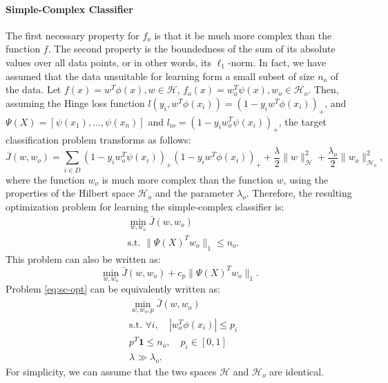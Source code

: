 \documentclass[12pt]{article}
\begin{document}
	\paragraph{Simple-Complex Classifier}
	The first necessary property for $f_o$ is that it be much more complex than the function $f$. The second property is the boundedness of the sum of its absolute values over all data points, or in other words, its $\ell_1$-norm. In fact, we have assumed that the data unsuitable for learning form a small subset of size $n_o$ of the data. Let $f(x) = w^T \phi(x), w \in \mathcal{H}$, $f_o(x) = w_o^T \psi(x), w_o \in \mathcal{H}_o$. Then, assuming the Hinge loss function $l(y_i, w^T\phi(x_i)) = (1 - y_i w^T\phi(x_i))_+$, and $\Psi(X) = [\psi(x_1), \ldots, \psi(x_n)]$ and $l_{io} = (1 - y_i w_o^T \psi(x_i))_+$, the target classification problem transforms as follows:
	\begin{equation}
		\label{eq:sc-obj}
		\bar{J}(w, w_o) = \sum_{i \in D} (1 - y_i w_o^T \psi(x_i))_+ (1 - y_i w^T \phi(x_i))_+ + \frac{\lambda}{2}\|w\|^2_{\mathcal{H}} + \frac{\lambda_o}{2}\|w_o\|^2_{\mathcal{H}_o},
	\end{equation}
	where the function $w_o$ is much more complex than the function $w$, using the properties of the Hilbert space $\mathcal{H}_o$ and the parameter $\lambda_o$. Therefore, the resulting optimization problem for learning the simple-complex classifier is:
	\begin{subequations}
		\label{eq:sc-opt}
		\begin{align}
			&\min_{w, w_o} \bar{J}(w, w_o) \\
			&\text{s.t. } \|\Psi(X)^T w_o\|_1 \le n_o.
		\end{align}
	\end{subequations}
	This problem can also be written as:
	\begin{equation}
		\min_{w, w_o} \bar{J}(w, w_o) + c_p \|\Psi(X)^T w_o\|_1.
	\end{equation}
	Problem \eqref{eq:sc-opt} can be equivalently written as:
	\begin{subequations}
		\label{eq:sc-opt-equivalent}
		\begin{align}
			&\min_{w, w_o, p} \bar{J}(w, w_o) \\
			&\text{s.t. } \forall i, \quad |w_o^T \phi(x_i)| \le p_i \\
			&p^T \mathbf{1} \le n_o, \quad p_i \in [0, 1] \\
			&\lambda \gg \lambda_o.
		\end{align}
	\end{subequations}
	For simplicity, we can assume that the two spaces $\mathcal{H}$ and $\mathcal{H}_o$ are identical.
	
\end{document}

